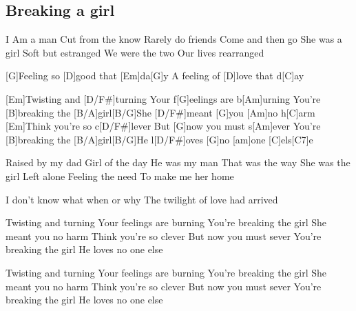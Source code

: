 \subsection*{Breaking a girl   }
\begin{guitar}
\begin{multicols}{2}
I Am a man
Cut from the know
Rarely do friends
Come and then go
She was a girl
Soft but estranged
We were the two
Our lives rearranged



[G]Feeling so [D]good that [Em]da[G]y
A feeling of [D]love that d[C]ay



[Em]Twisting and [D/F#]turning
Your f[G]eelings are b[Am]urning
You're [B]breaking the [B/A]girl[B/G]\qquad\qquad[B/F#]\qquad
[Em]She [D/F#]meant [G]you [Am]no h[C]arm
[Em]Think you're so c[D/F#]lever
But [G]now you must s[Am]ever
You're [B]breaking the [B/A]girl[B/G]\qquad\qquad[B/F#]\qquad
[Em]He l[D/F#]oves [G]no [am]one [C]els[C7]e



Raised by my dad
Girl of the day
He was my man
That was the way
She was the girl
Left alone
Feeling the need
To make me her home



I don't know what when or why
The twilight of love had arrived



Twisting and turning
Your feelings are burning
You're breaking the girl
She meant you no harm
Think you're so clever
But now you must sever
You're breaking the girl
He loves no one else
\columnbreak





Twisting and turning
Your feelings are burning
You're breaking the girl
She meant you no harm
Think you're so clever
But now you must sever
You're breaking the girl
He loves no one else
\\
\\
\\
\\
\\
\\
\\
\\
\\
\\
\end{multicols}
\end{guitar}
